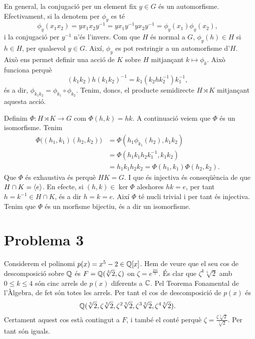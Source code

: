 \documentclass[12pt]{article}
\begin{document}
En general, la conjugació per un element fix \( y \in G \) és un automorfisme.
Efectivament, si la denotem per \( \phi_y \) es té
\begin{equation*}
	\phi_y(x_1 x_2) = yx_1 x_2y^{-1} = yx_1y^{-1} yx_2y^{-1} =
	\phi_y(x_1)\phi_y(x_2),
\end{equation*}
i la conjugació per \( y^{-1} \) n'és l'invers. Com que \( H \) és normal a \( G \),
\( \phi_y(h) \in H \) si \( h \in H \), per qualsevol \( y \in G \). Així, \( \phi_y \) es
pot restringir a un automorfisme d'\( H \). Això ens permet definir una acció de \( K \)
sobre \( H \) mitjançant \( k \mapsto \phi_k \). Això funciona perquè 
\begin{equation*}
	(k_1k_2)h(k_1k_2)^{-1} = k_1 (k_2hk_2^{-1}) k_1^{-1},
\end{equation*}
és a dir, \( \phi_{k_1 k_2} = \phi_{k_1} \circ \phi_{k_2} \). Tenim, doncs, el producte
semidirecte \( H \rtimes K \) mitjançant aquesta acció. 

Definim \( \Phi \colon H \rtimes K \to G \) com \( \Phi(h,k) = hk \). A continuació veiem
que \( \Phi \) és un isomorfisme. Tenim
\begin{align*}
	\Phi\big((h_1,k_1)(h_2,k_2)\big) & = \Phi(h_1 \phi_{k_1}(h_2), k_1 k_2) \\
																	 & = \Phi(h_1k_1h_2 k_1^{-1}, k_1k_2) \\
																	 & = h_1k_1h_2k_2 = \Phi(h_1,k_1) \Phi(h_2,k_2).
\end{align*}
Que \( \Phi \) és exhaustiva és perquè \( HK = G \). I que és injectiva és conseqüència de
que \( H \cap K = \left\langle e \right\rangle \). En efecte, si \( (h,k) \in \ker \Phi \) aleshores \( hk = e
\), per tant \( h = k^{-1} \in H\cap K \), és a dir \( h = k = e \). Així \( \Phi \) té
nucli trivial i per tant és injectiva. Tenim que \( \Phi \) és un morfisme bijectiu, és a
dir un isomorfisme.

\section*{Problema 3}
Considerem el polinomi \( p(x) = x^5 - 2 \in \mathbb{Q}[x] \). Hem de veure que el seu cos de
descomposició sobre \( \mathbb{Q} \) és \( F = \mathbb{Q}(\sqrt[5]{2}, \zeta) \) on \( \zeta =
e^{\frac{2\pi i}{5}} \). És clar que \( \zeta^k \sqrt[5]{2} \) amb \( 0 \leq k \leq 4 \)
són cinc arrels de \( p(x) \) diferents a \( \mathbb{C} \). Pel Teorema Fonamental de l'Àlgebra,
de fet són totes les arrels. Per tant el cos de descomposició de \( p(x) \) és
\begin{equation*}
	\mathbb{Q}(\sqrt[5]{2}, \zeta \sqrt[5]{2}, \zeta^2\sqrt[5]{2}, \zeta^3 \sqrt[5]{2}, \zeta^4
	\sqrt[5]{2}).
\end{equation*}
Certament aquest cos està contingut a \( F \), i també el conté perquè \( \zeta =
\frac{\zeta \sqrt[5]{2}}{\sqrt[5]{2}} \). Per tant són iguals. 
\end{document}

